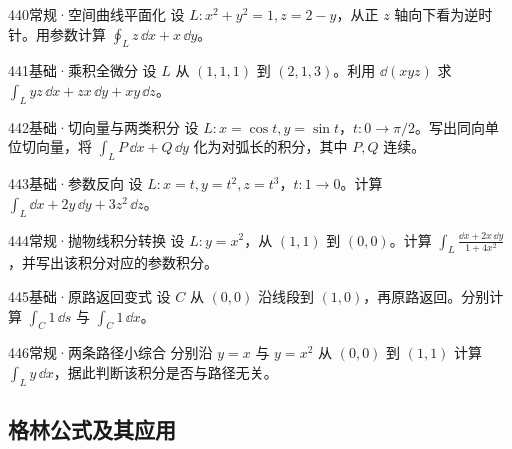 \begin{exercise}{440}{常规·空间曲线平面化}
设 $L:x^2+y^2=1,z=2-y$，从正 $z$ 轴向下看为逆时针。用参数计算 $\oint_Lz\,\dd x+x\,\dd y$。
\end{exercise}
\begin{exercise}{441}{基础·乘积全微分}
设 $L$ 从 $(1,1,1)$ 到 $(2,1,3)$。利用 $\dd(xyz)$ 求 $\int_Lyz\,\dd x+zx\,\dd y+xy\,\dd z$。
\end{exercise}
\begin{exercise}{442}{基础·切向量与两类积分}
设 $L:x=\cos t,y=\sin t$，$t:0\to\pi/2$。写出同向单位切向量，将 $\int_LP\,\dd x+Q\,\dd y$ 化为对弧长的积分，其中 $P,Q$ 连续。
\end{exercise}
\begin{exercise}{443}{基础·参数反向}
设 $L:x=t,y=t^2,z=t^3$，$t:1\to0$。计算 $\int_L\dd x+2y\,\dd y+3z^2\,\dd z$。
\end{exercise}
\begin{exercise}{444}{常规·抛物线积分转换}
设 $L:y=x^2$，从 $(1,1)$ 到 $(0,0)$。计算 $\int_L\frac{\dd x+2x\,\dd y}{1+4x^2}$，并写出该积分对应的参数积分。
\end{exercise}
\begin{exercise}{445}{基础·原路返回变式}
设 $C$ 从 $(0,0)$ 沿线段到 $(1,0)$，再原路返回。分别计算 $\int_C1\,\dd s$ 与 $\int_C1\,\dd x$。
\end{exercise}
\begin{exercise}{446}{常规·两条路径小综合}
分别沿 $y=x$ 与 $y=x^2$ 从 $(0,0)$ 到 $(1,1)$ 计算 $\int_Ly\,\dd x$，据此判断该积分是否与路径无关。
\end{exercise}
\subsection{格林公式及其应用}

